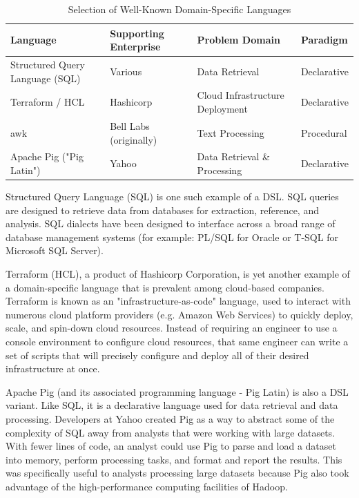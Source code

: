 \begin{table}[ht]
    \centering
        \begin{tabular}{|p{6cm}|p{4cm}|p{4cm}|p{2cm}|}
        \hline
        \textbf{Language} & \textbf{Supporting \newline Enterprise} & \textbf{Problem Domain} & \textbf{Paradigm} \\
        \hline
        Structured Query Language (SQL) & Various & Data Retrieval & Declarative \\
        \hline
        Terraform / HCL & Hashicorp & Cloud Infrastructure Deployment & Declarative \\
        \hline
        awk & Bell Labs (originally) & Text Processing & Procedural \\
        \hline
        Apache Pig ("Pig Latin") & Yahoo & Data Retrieval \newline \& Processing & Declarative \\
        \hline
        \end{tabular}
    \caption{Selection of Well-Known Domain-Specific Languages}
    \label{tab:well-known-dsl}
\end{table}

Structured Query Language (SQL) is one such example of a DSL. SQL queries are designed to retrieve data from databases for extraction, reference, and analysis. SQL dialects have been designed to interface across a broad range of database management systems (for example: PL/SQL for Oracle or T-SQL for Microsoft SQL Server).

Terraform (HCL), a product of Hashicorp Corporation, is yet another example of a domain-specific language that is prevalent among cloud-based companies. Terraform is known as an "infrastructure-as-code" language, used to interact with numerous cloud platform providers (e.g. Amazon Web Services) to quickly deploy, scale, and spin-down cloud resources. Instead of requiring an engineer to use a console environment to configure cloud resources, that same engineer can write a set of scripts that will precisely configure and deploy all of their desired infrastructure at once.

Apache Pig (and its associated programming language - Pig Latin) is also a DSL variant. Like SQL, it is a declarative language used for data retrieval and data processing. Developers at Yahoo created Pig as a way to abstract some of the complexity of SQL away from analysts that were working with large datasets. With fewer lines of code, an analyst could use Pig to parse and load a dataset into memory, perform processing tasks, and format and report the results. This was specifically useful to analysts processing large datasets because Pig also took advantage of the high-performance computing facilities of Hadoop.

